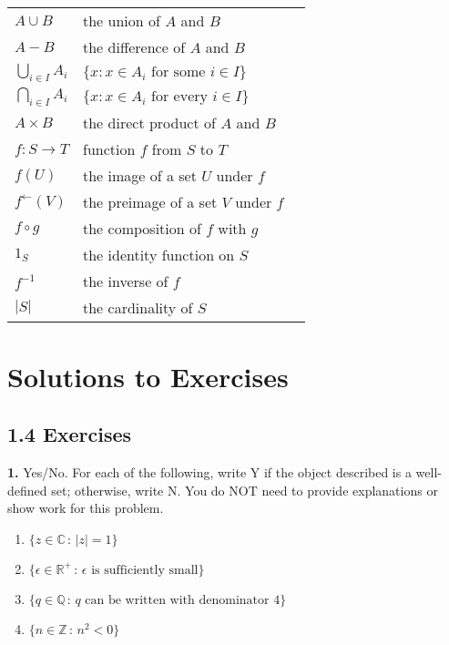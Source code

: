\documentclass[10pt,]{book}
\theoremstyle{plain}
\theoremstyle{definition}
\theoremstyle{definition}
\theoremstyle{definition}
\theoremstyle{definition}
\numberwithin{equation}{section}
\def\Z{\mathbb{Z}}
\def\R{\mathbb{R}}
\def\Q{\mathbb{Q}}
\def\C{\mathbb{C}}
\newcommand{\lt}{ < }
\begin{document}
\begin{longtable}[l]{lp{}r}
$A\cup B$&the union of  \(A\) and \(B\)&\pageref{notation-18}\\
$A - B$&the difference of  \(A\) and \(B\)&\pageref{notation-19}\\
$\bigcup_{i\in I}A_i$&\(\{x: x\in A_i \text{ for some }  i\in I\}\)&\pageref{notation-20}\\
$\bigcap_{i\in I}A_i$&\(\{x: x\in A_i \text{ for every }  i\in I\}\)&\pageref{notation-21}\\
$A\times B$&the direct product of  \(A\) and \(B\)&\pageref{notation-22}\\
$f:S\to T$&function \(f\) from  \(S\) to  \(T\)&\pageref{notation-23}\\
$f(U)$&the image of a set \(U\) under \(f\)&\pageref{notation-24}\\
$f^{\leftarrow}(V)$&the preimage of a set \(V\) under \(f\)&\pageref{notation-25}\\
$f\circ g$&the composition of  \(f\) with  \(g\)&\pageref{notation-26}\\
$1_S$&the identity function on \(S\)&\pageref{notation-27}\\
$f^{-1}$&the inverse of \(f\)&\pageref{notation-28}\\
$|S|$&the cardinality of  \(S\)&\pageref{notation-29}\\
\end{longtable}
\typeout{************************************************}
\typeout{************************************************}
\chapter[{Solutions to Exercises}]{Solutions to Exercises}\label{appendix-2}
\section*{1.4 Exercises}
\noindent\textbf{1.}\quad{}
        Yes/No. For each of the following, write Y if the object described is a well-defined set; otherwise, write N. You do NOT need to provide explanations or show work for this problem.
        \leavevmode%
\begin{enumerate}[label=(\alph*)]
\item\hypertarget{li-23}{}
              \(\{z \in \C \,:\, |z|=1\}\)
\item\hypertarget{li-24}{}
              \(\{\epsilon \in \R^+\,:\, \epsilon \mbox{ is sufficiently small} \}\)
\item\hypertarget{li-25}{}
              \(\{q\in \Q \,:\, q \mbox{ can be written  with denominator } 4\}\)
\item\hypertarget{li-26}{}
              \(\{n \in \Z\,:\, n^2 \lt 0\}\)
\end{enumerate}
\end{document}
